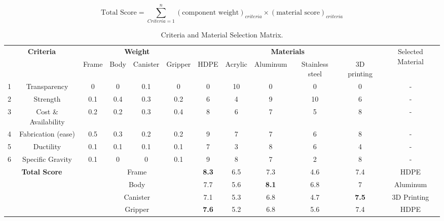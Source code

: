 \scriptsize
\begin{equation}
  \label{eq:material_selection}
  \text{Total Score} = \sum_{\textit{Criteria}=1}^{n} (\text{component weight})_{\textit{criteria}} \times (\text{material score})_{\textit{criteria}}
\end{equation}
\normalsize

\begin{table}[h]
  \centering
  \renewcommand{\arraystretch}{1.2} 
  \begin{adjustbox}{width=\columnwidth}
  \begin{tabular}{|cc|cccc|ccccc|c|}
  \hline
  \multicolumn{2}{|c|}{\multirow{2}{*}{\textbf{Criteria}}} & \multicolumn{4}{c|}{\textbf{Weight}} & \multicolumn{5}{c|}{\textbf{Materials}} & \multirow{2}{*}{Selected Material} \\ \cline{3-11}
  & & Frame & Body & Canister & Gripper & HDPE & Acrylic & Aluminum & Stainless steel & 3D printing & \\ \hline
  \multicolumn{1}{|c|}{1} & Transparency & 0 & 0 & 0.1 & 0 & 0 & 10 & 0 & 0 & 0 & - \\
  \multicolumn{1}{|c|}{2} & Strength & 0.1 & 0.4 & 0.3 & 0.2 & 6 & 4 & 9 & 10 & 6 & - \\
  \multicolumn{1}{|c|}{3} & Cost \& Availability & 0.2 & 0.2 & 0.3 & 0.4 & 8 & 6 & 7 & 5 & 8 & - \\
  \multicolumn{1}{|c|}{4} & Fabrication (ease) & 0.5 & 0.3 & 0.2 & 0.2 & 9 & 7 & 7 & 6 & 8 & - \\
  \multicolumn{1}{|c|}{5} & Ductility & 0.1 & 0.1 & 0.1 & 0.1 & 7 & 3 & 8 & 6 & 4 & - \\
  \multicolumn{1}{|c|}{6} & Specific Gravity & 0.1 & 0 & 0 & 0.1 & 9 & 8 & 7 & 2 & 8 & - \\ \hline
  \multicolumn{2}{|c|}{\multirow{4}{*}{\textbf{Total Score}}} & \multicolumn{4}{c|}{Frame} & \textbf{8.3} & 6.5 & 7.3 & 4.6 & 7.4 & HDPE \\
  & & \multicolumn{4}{c|}{Body} & 7.7 & 5.6 & \textbf{8.1} & 6.8 & 7 & Aluminum \\
  & & \multicolumn{4}{c|}{Canister} & 7.1 & 5.3 & 6.8 & 4.7 & \textbf{7.5} & 3D Printing \\
  & & \multicolumn{4}{c|}{Gripper} & \textbf{7.6} & 5.2 & 6.8 & 5.6 & 7.4 & HDPE \\ \hline
  \end{tabular}
  \end{adjustbox}
  \caption{Criteria and Material Selection Matrix.}
  \label{tab:material_selection}
  
\end{table}

